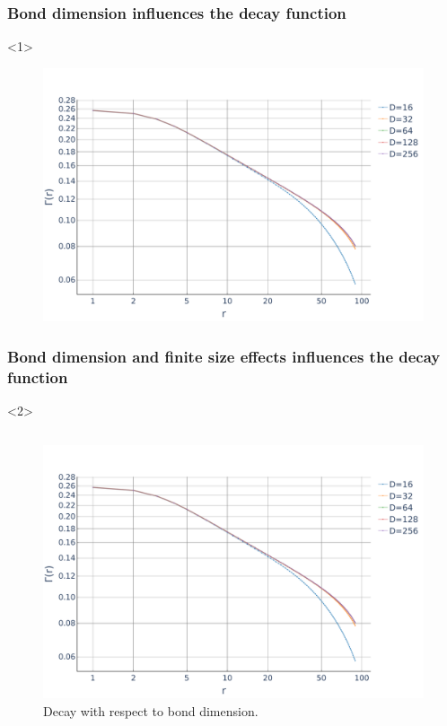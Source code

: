 \documentclass[aspectratio=169]{beamer}
\renewcommand\emph[1]{\textcolor{ugent_blue}{\textbf{#1}}}
\begin{document}
\begin{frame}
  \frametitle<1>{Bond dimension influences the decay function}
  \begin{onlyenv}<1>
    \begin{figure}[ht]
      \centering
      \includegraphics[scale=0.3]{../img/Correlations-bonds.pdf}
    \end{figure}
  \end{onlyenv}
  \frametitle<2>{Bond dimension \emph{and finite size effects} influences the decay function}
  \begin{onlyenv}<2>
    \begin{columns}[onlytextwidth]
      \begin{column}{0.5\textwidth}
        \begin{figure}[ht]
          \centering
          \includegraphics[scale=0.2]{../img/Correlations-bonds.pdf}
          \caption*{Decay with respect to bond dimension.}
        \end{figure}
      \end{column}


\end{columns}
\end{onlyenv}
\end{frame}
\end{document}
